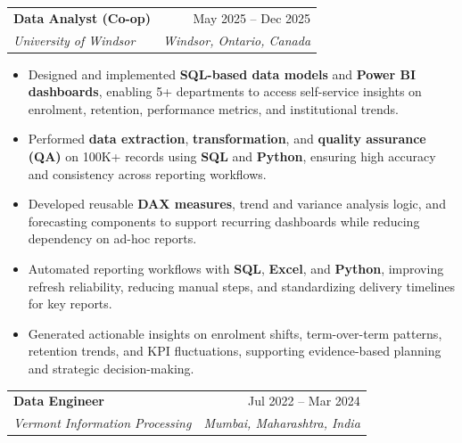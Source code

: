 \documentclass[letterpaper,10pt]{article}
\makeatletter
\newcommand{\resumeItem}[1]{
  \item\small{
    {#1 \vspace{-2pt}}
  }
}
\newcommand{\resumeExperienceSubheading}[4]{
  \vspace{-2pt}\item
    \begin{tabular*}{0.97\textwidth}[t]{l@{\extracolsep{\fill}}r}
      \textbf{#1} & #2 \\
      \textit{\small#3} & \textit{\small #4} \\
    \end{tabular*}\vspace{-7pt}
}
\newcommand{\resumeItemListStart}{\begin{itemize}}
\newcommand{\resumeItemListEnd}{\end{itemize}\vspace{-5pt}}
\makeatother
\begin{document}
\resumeExperienceSubheading
{Data Analyst (Co-op)}{May 2025 -- Dec 2025}
{University of Windsor}{Windsor, Ontario, Canada}

\resumeItemListStart
\resumeItem{Designed and implemented \textbf{SQL-based data models} and \textbf{Power BI dashboards}, enabling 5+ departments to access self-service insights on enrolment, retention, performance metrics, and institutional trends.}
\resumeItem{Performed \textbf{data extraction}, \textbf{transformation}, and \textbf{quality assurance (QA)} on 100K+ records using \textbf{SQL} and \textbf{Python}, ensuring high accuracy and consistency across reporting workflows.}
\resumeItem{Developed reusable \textbf{DAX measures}, trend and variance analysis logic, and forecasting components to support recurring dashboards while reducing dependency on ad-hoc reports.}
\resumeItem{Automated reporting workflows with \textbf{SQL}, \textbf{Excel}, and \textbf{Python}, improving refresh reliability, reducing manual steps, and standardizing delivery timelines for key reports.}
\resumeItem{Generated actionable insights on enrolment shifts, term-over-term patterns, retention trends, and KPI fluctuations, supporting evidence-based planning and strategic decision-making.}




\resumeItemListEnd

\resumeExperienceSubheading
{Data Engineer}{Jul 2022 -- Mar 2024}
{Vermont Information Processing}{Mumbai, Maharashtra, India}
\end{document}
